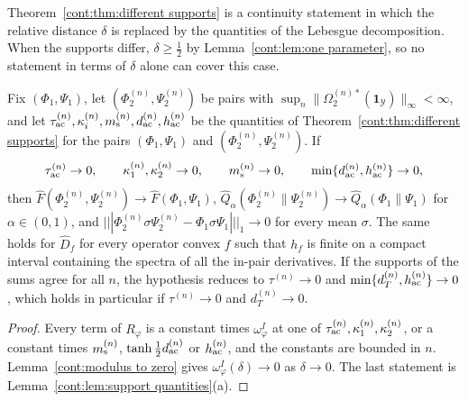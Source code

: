 Theorem~\ref{cont:thm:different supports} is a continuity statement in which the relative distance $\delta$ is replaced by the quantities of the Lebesgue decomposition. When the supports differ, $\delta\geq\frac12$ by Lemma~\ref{cont:lem:one parameter}, so no statement in terms of $\delta$ alone can cover this case.

\begin{corollary}\label{cont:cor:support continuity}
Fix $(\Phi_1,\Psi_1)$, let $(\Phi_2^{(n)},\Psi_2^{(n)})$ be pairs with $\sup_n\|\Omega_2^{(n)*}(\mathbf{1}_{\mathcal{Y}})\|_\infty<\infty$, and let $\tau_{\rm ac}^{(n)},\kappa_i^{(n)},m_{\rm s}^{(n)},d_{\rm ac}^{(n)},h_{\rm ac}^{(n)}$ be the quantities of Theorem~\ref{cont:thm:different supports} for the pairs $(\Phi_1,\Psi_1)$ and $(\Phi_2^{(n)},\Psi_2^{(n)})$. If
\[
\tau_{\rm ac}^{(n)}\to0,\qquad\kappa_1^{(n)},\kappa_2^{(n)}\to0,\qquad m_{\rm s}^{(n)}\to0,\qquad\min\{d_{\rm ac}^{(n)},h_{\rm ac}^{(n)}\}\to0,
\]
then $\widehat F(\Phi_2^{(n)},\Psi_2^{(n)})\to\widehat F(\Phi_1,\Psi_1)$, $\widehat Q_\alpha(\Phi_2^{(n)}\|\Psi_2^{(n)})\to\widehat Q_\alpha(\Phi_1\|\Psi_1)$ for $\alpha\in(0,1)$, and $|||\Phi_2^{(n)}\sigma\Psi_2^{(n)}-\Phi_1\sigma\Psi_1|||_1\to0$ for every mean $\sigma$. The same holds for $\widehat D_f$ for every operator convex $f$ such that $h_f$ is finite on a compact interval containing the spectra of all the in-pair derivatives. If the supports of the sums agree for all $n$, the hypothesis reduces to $\tau^{(n)}\to0$ and $\min\{d_T^{(n)},h_{\rm ac}^{(n)}\}\to0$, which holds in particular if $\tau^{(n)}\to0$ and $d_T^{(n)}\to0$.
\end{corollary}

\begin{proof}
Every term of $R_\varphi$ is a constant times $\omega^I_\varphi$ at one of $\tau_{\rm ac}^{(n)},\kappa_1^{(n)},\kappa_2^{(n)}$, or a constant times $m_{\rm s}^{(n)}$, $\tanh\frac12d_{\rm ac}^{(n)}$ or $h_{\rm ac}^{(n)}$, and the constants are bounded in $n$. Lemma~\ref{cont:modulus to zero} gives $\omega^I_\varphi(\delta)\to0$ as $\delta\to0$. The last statement is Lemma~\ref{cont:lem:support quantities}(a).
\end{proof}


